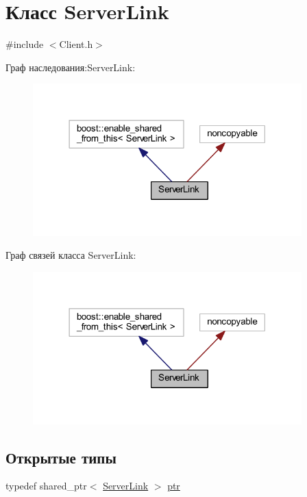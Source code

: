 \hypertarget{class_server_link}{}\section{Класс Server\+Link}
\label{class_server_link}


{\ttfamily \#include $<$Client.\+h$>$}



Граф наследования\+:Server\+Link\+:\nopagebreak
\begin{figure}[H]
\begin{center}
\leavevmode
\includegraphics[width=294pt]{class_server_link__inherit__graph}
\end{center}
\end{figure}


Граф связей класса Server\+Link\+:\nopagebreak
\begin{figure}[H]
\begin{center}
\leavevmode
\includegraphics[width=294pt]{class_server_link__coll__graph}
\end{center}
\end{figure}
\subsection*{Открытые типы}
\begin{DoxyCompactItemize}
\item 
typedef shared\+\_\+ptr$<$ \mbox{\hyperlink{class_server_link}{Server\+Link}} $>$ \mbox{\hyperlink{class_server_link_afb05b9f4060b17ac50d2fb3b874ce236}{ptr}}
\end{DoxyCompactItemize}
